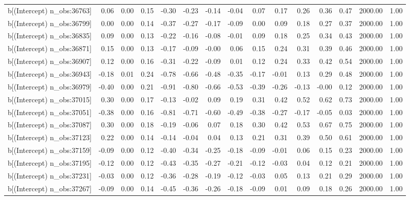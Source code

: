 \begin{table}[ht]
\begin{tabular}{rrrrrrrrrrrrrrr}
  b[(Intercept) n\_obs:36763] & 0.06 & 0.00 & 0.15 & -0.30 & -0.23 & -0.14 & -0.04 & 0.07 & 0.17 & 0.26 & 0.36 & 0.47 & 2000.00 & 1.00 \\ 
  b[(Intercept) n\_obs:36799] & 0.00 & 0.00 & 0.14 & -0.37 & -0.27 & -0.17 & -0.09 & 0.00 & 0.09 & 0.18 & 0.27 & 0.37 & 2000.00 & 1.00 \\ 
  b[(Intercept) n\_obs:36835] & 0.09 & 0.00 & 0.13 & -0.22 & -0.16 & -0.08 & -0.01 & 0.09 & 0.18 & 0.25 & 0.34 & 0.43 & 2000.00 & 1.00 \\ 
  b[(Intercept) n\_obs:36871] & 0.15 & 0.00 & 0.13 & -0.17 & -0.09 & -0.00 & 0.06 & 0.15 & 0.24 & 0.31 & 0.39 & 0.46 & 2000.00 & 1.00 \\ 
  b[(Intercept) n\_obs:36907] & 0.12 & 0.00 & 0.16 & -0.31 & -0.22 & -0.09 & 0.01 & 0.12 & 0.24 & 0.33 & 0.42 & 0.54 & 2000.00 & 1.00 \\ 
  b[(Intercept) n\_obs:36943] & -0.18 & 0.01 & 0.24 & -0.78 & -0.66 & -0.48 & -0.35 & -0.17 & -0.01 & 0.13 & 0.29 & 0.48 & 2000.00 & 1.00 \\ 
  b[(Intercept) n\_obs:36979] & -0.40 & 0.00 & 0.21 & -0.91 & -0.80 & -0.66 & -0.53 & -0.39 & -0.26 & -0.13 & -0.00 & 0.12 & 2000.00 & 1.00 \\ 
  b[(Intercept) n\_obs:37015] & 0.30 & 0.00 & 0.17 & -0.13 & -0.02 & 0.09 & 0.19 & 0.31 & 0.42 & 0.52 & 0.62 & 0.73 & 2000.00 & 1.00 \\ 
  b[(Intercept) n\_obs:37051] & -0.38 & 0.00 & 0.16 & -0.81 & -0.71 & -0.60 & -0.49 & -0.38 & -0.27 & -0.17 & -0.05 & 0.03 & 2000.00 & 1.00 \\ 
  b[(Intercept) n\_obs:37087] & 0.30 & 0.00 & 0.18 & -0.19 & -0.06 & 0.07 & 0.18 & 0.30 & 0.42 & 0.53 & 0.67 & 0.75 & 2000.00 & 1.00 \\ 
  b[(Intercept) n\_obs:37123] & 0.22 & 0.00 & 0.14 & -0.14 & -0.04 & 0.04 & 0.13 & 0.21 & 0.31 & 0.39 & 0.50 & 0.61 & 2000.00 & 1.00 \\ 
  b[(Intercept) n\_obs:37159] & -0.09 & 0.00 & 0.12 & -0.40 & -0.34 & -0.25 & -0.18 & -0.09 & -0.01 & 0.06 & 0.15 & 0.23 & 2000.00 & 1.00 \\ 
  b[(Intercept) n\_obs:37195] & -0.12 & 0.00 & 0.12 & -0.43 & -0.35 & -0.27 & -0.21 & -0.12 & -0.03 & 0.04 & 0.12 & 0.21 & 2000.00 & 1.00 \\ 
  b[(Intercept) n\_obs:37231] & -0.03 & 0.00 & 0.12 & -0.36 & -0.28 & -0.19 & -0.12 & -0.03 & 0.05 & 0.13 & 0.21 & 0.29 & 2000.00 & 1.00 \\ 
  b[(Intercept) n\_obs:37267] & -0.09 & 0.00 & 0.14 & -0.45 & -0.36 & -0.26 & -0.18 & -0.09 & 0.01 & 0.09 & 0.18 & 0.26 & 2000.00 & 1.00 \\ 

\end{tabular}
\end{table}
